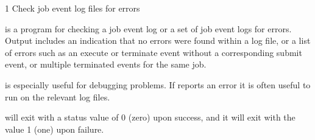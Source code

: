 \begin{ManPage}{\label{man-condor-check-userlogs}}{1}
{Check job event log files for errors}


\Synopsis {}

\Description

 is a program for checking a job event log or
a set of job event logs for errors.  
Output includes an indication that no errors were found
within a log file,
or a list of errors such as an
execute or terminate event without a corresponding submit event,
or multiple terminated events for the same job.

 is especially useful for debugging
 problems.  If  reports an error
it is often useful to run  on the relevant
log files.

\ExitStatus

 will exit with a status value of 0 (zero)
upon success, and it will exit with the value 1 (one) upon failure.

\end{ManPage}

